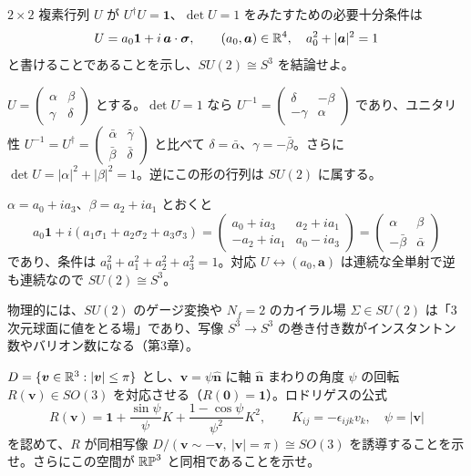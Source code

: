 \begin{problem}[難易度 A]\label{ch01-prob-su2}
$2\times2$ 複素行列 $U$ が $U^\dagger U=\mathbf 1$、$\det U=1$ をみたすための必要十分条件は
\[
U=a_0\mathbf 1+i\,\bm a\cdot\bm\sigma,\qquad (a_0,\bm a)\in\mathbb{R}^4,\quad a_0^2+\lvert\bm a\rvert^2=1
\]
と書けることであることを示し、$SU(2)\cong S^3$ を結論せよ。
\end{problem}

\begin{solution}
$U=\begin{pmatrix}\alpha&\beta\\\gamma&\delta\end{pmatrix}$ とする。$\det U=1$ なら $U^{-1}=\begin{pmatrix}\delta&-\beta\\-\gamma&\alpha\end{pmatrix}$ であり、ユニタリ性 $U^{-1}=U^\dagger=\begin{pmatrix}\bar\alpha&\bar\gamma\\\bar\beta&\bar\delta\end{pmatrix}$ と比べて $\delta=\bar\alpha$、$\gamma=-\bar\beta$。さらに $\det U=\lvert\alpha\rvert^2+\lvert\beta\rvert^2=1$。逆にこの形の行列は $SU(2)$ に属する。

$\alpha=a_0+ia_3$、$\beta=a_2+ia_1$ とおくと
\[
a_0\mathbf 1+i(a_1\sigma_1+a_2\sigma_2+a_3\sigma_3)=\begin{pmatrix}a_0+ia_3&a_2+ia_1\\-a_2+ia_1&a_0-ia_3\end{pmatrix}=\begin{pmatrix}\alpha&\beta\\-\bar\beta&\bar\alpha\end{pmatrix}
\]
であり、条件は $a_0^2+a_1^2+a_2^2+a_3^2=1$。対応 $U\leftrightarrow(a_0,\bm a)$ は連続な全単射で逆も連続なので $SU(2)\cong S^3$。

物理的には、$SU(2)$ のゲージ変換や $N_f=2$ のカイラル場 $\Sigma\in SU(2)$ は「3次元球面に値をとる場」であり、写像 $S^3\to S^3$ の巻き付き数がインスタントン数やバリオン数になる（第3章）。
\end{solution}

\begin{problem}[難易度 B]\label{ch01-prob-so3}
$D=\{\bm v\in\mathbb{R}^3:\lvert\bm v\rvert\le\pi\}$ とし、$\bm v=\psi\hat{\bm n}$ に軸 $\hat{\bm n}$ まわりの角度 $\psi$ の回転 $R(\bm v)\in SO(3)$ を対応させる（$R(\bm 0)=\mathbf 1$）。ロドリゲスの公式
\[
R(\bm v)=\mathbf 1+\frac{\sin\psi}{\psi}K+\frac{1-\cos\psi}{\psi^2}K^2,\qquad K_{ij}=-\epsilon_{ijk}v_k,\quad\psi=\lvert\bm v\rvert
\]
を認めて、$R$ が同相写像 $D/(\bm v\sim-\bm v,\ \lvert\bm v\rvert=\pi)\cong SO(3)$ を誘導することを示せ。さらにこの空間が $\mathbb{RP}^3$ と同相であることを示せ。
\end{problem}

